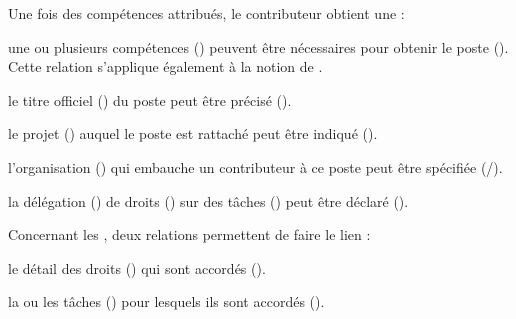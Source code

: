 Une fois des compétences attribués, le contributeur obtient une  :
\begin{liste}
	\item une ou plusieurs compétences () peuvent être nécessaires pour obtenir le poste (). 
	Cette relation s'applique également à la notion de .
	\item le titre officiel () du poste peut être précisé ().
	\item le projet () auquel le poste est rattaché peut être indiqué ().
	\item l'organisation () qui embauche un contributeur à ce poste peut être spécifiée (/).
	\item la délégation () de droits () sur des tâches () peut être déclaré ().
\end{liste}

Concernant les , deux relations permettent de faire le lien :
\begin{liste}
	\item le détail des droits () qui sont accordés ().
	\item la ou les tâches () pour lesquels ils sont accordés ().
\end{liste}





























